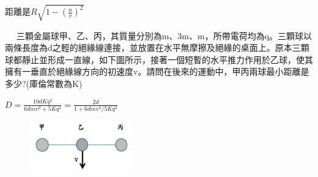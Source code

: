 \documentclass[cn,10pt,math=newtx,chinesefont=founder]{elegantbook}
\begin{document}
\begin{solution}
距離是$R\sqrt{1-(\frac{u}{v})^2}$
\end{solution}

\newpage


\begin{example}　
    三顆金屬球甲、乙、丙，其質量分別為m、3m、m，所帶電荷均為q。三顆球以兩條長度為d之輕的絕緣線連接，並放置在水平無摩擦及絕緣的桌面上。原本三顆球都靜止並形成一直線，如下圖所示，接著一個短暫的水平推力作用於乙球，使其擁有一垂直於絕緣線方向的初速度v。請問在後來的運動中，甲丙兩球最小距離是多少?(庫倫常數為K)
    
    \rightline{[4]}
\end{example}

\begin{solution}
$D=\frac{10dKq^2}{6dmv^2+5Kq^2}=\frac{2d}{1+6dmv^2/5Kq^2}$
\end{solution}

\begin{figure}[htbp]
\flushright
\includegraphics[width=0.4\textwidth]{image/4444.JPG}
\end{figure}

\newpage
\end{document}
